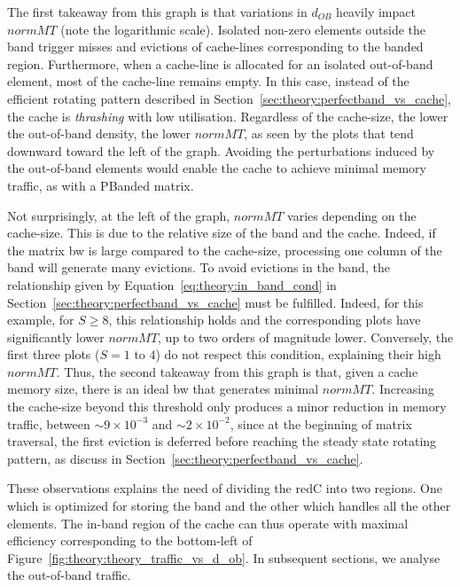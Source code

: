 The first takeaway from this graph is that variations in $d_\mathit{OB}$ heavily impact $\mathit{normMT}$ (note the logarithmic scale).
Isolated non-zero elements outside the \gls{band} trigger misses and \glspl{eviction} of cache-lines corresponding to the \gls{banded} region.
Furthermore, when a cache-line is allocated for an isolated out-of-\gls{band} element, most of the cache-line remains empty.
In this case, instead of the efficient rotating pattern described in Section~\ref{sec:theory:perfectband_vs_cache}, the cache is \emph{thrashing} with low utilisation.
Regardless of the cache-size, the lower the out-of-\gls{band} density, the lower $\mathit{normMT}$, as seen by the plots that tend downward toward the left of the graph.
Avoiding the perturbations induced by the out-of-\gls{band} elements would enable the cache to achieve minimal memory traffic, as with a \gls{PBanded} matrix.

Not surprisingly, at the left of the graph, $\mathit{normMT}$ varies depending on the cache-size.
This is due to the relative size of the \gls{band} and the cache.
Indeed, if the matrix \gls{bw} is large compared to the cache-size, processing one column of the \gls{band} will generate many \glspl{eviction}.
To avoid \glspl{eviction} in the \gls{band}, the relationship given by Equation~\ref{eq:theory:in_band_cond} in Section~\ref{sec:theory:perfectband_vs_cache} must be fulfilled.
Indeed, for this example, for $S \geqslant 8$, this relationship holds and the corresponding plots have significantly lower $\mathit{normMT}$, up to two orders of magnitude lower.
Conversely, the first three plots ($S = 1$ to $4$) do not respect this condition, explaining their high $\mathit{normMT}$.
Thus, the second takeaway from this graph is that, given a cache memory size, there is an ideal \gls{bw} that generates minimal $\mathit{normMT}$.
Increasing the cache-size beyond this threshold only produces a minor reduction in memory traffic, between $\sim 9 \times 10^{-3}$ and $\sim 2 \times 10^{-2}$, since at the beginning of matrix traversal, the first \gls{eviction} is deferred before reaching the steady state rotating pattern, as discuss in Section~\ref{sec:theory:perfectband_vs_cache}.

These observations explains the need of dividing the \gls{redC} into two regions.
One which is optimized for storing the \gls{band} and the other which handles all the other elements.
The in-\gls{band} region of the cache can thus operate with maximal efficiency corresponding to the bottom-left of Figure~\ref{fig:theory:theory_traffic_vs_d_ob}.
In subsequent sections, we analyse the out-of-\gls{band} traffic.


